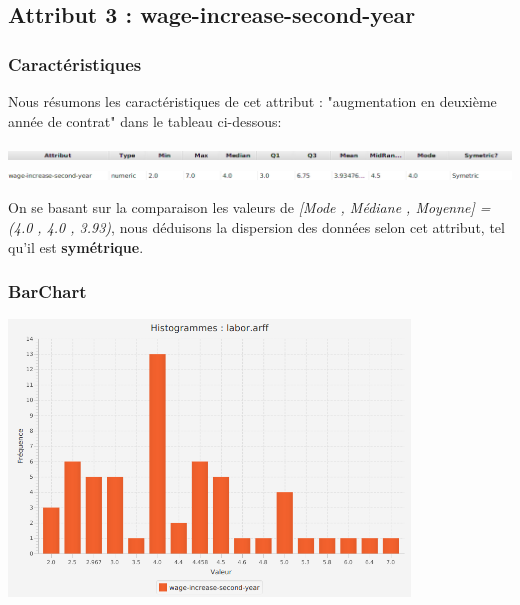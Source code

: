 \documentclass[12pt,a4paper,oneside]{book}
\begin{document}
	
	\newpage
	
	
	\subsection{Attribut 3 : wage-increase-second-year }
	\subsubsection{Caractéristiques}
	Nous résumons les caractéristiques de cet attribut : "augmentation en deuxième année de contrat" dans le tableau ci-dessous:
	\begin{center}
		\includegraphics[width=1\textwidth]{screens/att.png}\\ \includegraphics[width=1\textwidth]{screens/att-3.png}%
		\label{labelname}%
	\end{center}
	
	On se basant sur la comparaison les valeurs de \textit{[Mode , Médiane , Moyenne] = (4.0 , 4.0 , 3.93)}, nous déduisons la dispersion des données selon cet attribut, tel qu'il est \textbf{symétrique}.
	
	\subsubsection{BarChart}
	
	\begin{center}
		\includegraphics[width=0.8\textwidth]{screens/barchart/wage-increase-second-year-barchart.png}%
		\label{labelname}%
	\end{center}	
	
\end{document}
